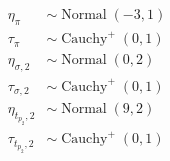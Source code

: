 \documentclass{article}
\newcommand{\op}{\operatorname}
\begin{document}
\begin{align*}
  \eta_{\pi} & \sim \op{Normal}(-3, 1)\\
  \tau_{\pi} & \sim \op{Cauchy}^+(0, 1)\\
  \eta_{\sigma ,2} & \sim \op{Normal}(0, 2)\\
  \tau_{\sigma ,2} & \sim \op{Cauchy}^+(0, 1)\\
  \eta_{t_{p_2},2} & \sim \op{Normal}(9, 2)\\
  \tau_{t_{p_2},2} & \sim \op{Cauchy}^+(0, 1)
 \end{align*} 
 
\end{document}
